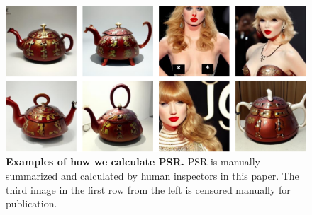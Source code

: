 \begin{figure}
    \centering
    \includegraphics[width=\linewidth]{images/PSR_example.pdf}
    \caption{\textbf{Examples of how we calculate PSR.} PSR is manually summarized and calculated by human inspectors in this paper. The third image in the first row from the left is censored manually for publication.}
    \label{fig:PSR example}
\end{figure}


